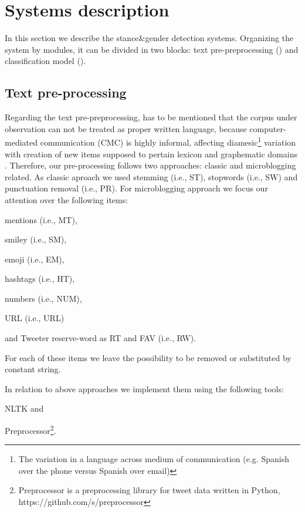 \section{Systems description} \label{sec:system}

In this section we describe the stance\&gender detection systems. Organizing the system by modules, it can be divided in two blocks: text pre-preprocessing () and classification model (). 


\subsection{Text pre-processing} \label{subsec:preprocessing}
Regarding the text pre-preprocessing, has to be mentioned that the corpus under observation can not be treated as proper written language, because computer-mediated communication (CMC) is highly informal, affecting diamesic\footnote{The variation in a language across medium of communication (e.g. Spanish over the phone versus Spanish over email)} variation with creation of new items supposed to pertain lexicon and graphematic domains \cite{bazzanella2011oscillazioni,cerruti2013netspeak}.
Therefore, our pre-processing follows two approaches: classic and microblogging related.
As classic aproach we used stemming (i.e., ST), stopwords (i.e., SW) and punctuation removal (i.e., PR).
For microblogging approach we focus our attention over the following items:
\begin{enumerate*}
\item mentions (i.e., MT),
\item smiley (i.e., SM),
\item emoji (i.e., EM),
\item hashtags (i.e., HT),
\item numbers (i.e., NUM),
\item URL (i.e., URL)
\item and Tweeter reserve-word as RT and FAV (i.e., RW).
\end{enumerate*}
For each of these items we leave the possibility to be removed or substituted by constant string.

In relation to above approaches we implement them using the following tools:
\begin{enumerate*}
\item NLTK \cite{nltk} and 
\item Preprocessor\footnote{Preprocessor is a preprocessing library for tweet data written in Python, https://github.com/s/preprocessor}.
\end{enumerate*}




